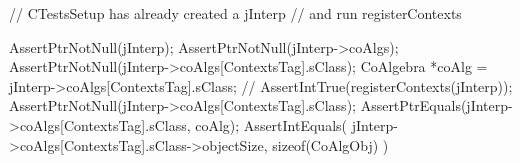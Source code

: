 
\startCTest
  // CTestsSetup has already created a jInterp
  // and run registerContexts
  
  AssertPtrNotNull(jInterp);
  AssertPtrNotNull(jInterp->coAlgs);
  AssertPtrNotNull(jInterp->coAlgs[ContextsTag].sClass);
  CoAlgebra *coAlg = jInterp->coAlgs[ContextsTag].sClass;
//  AssertIntTrue(registerContexts(jInterp));
  AssertPtrNotNull(jInterp->coAlgs[ContextsTag].sClass);
  AssertPtrEquals(jInterp->coAlgs[ContextsTag].sClass, coAlg);
  AssertIntEquals(
    jInterp->coAlgs[ContextsTag].sClass->objectSize,
    sizeof(CoAlgObj)
  )
\stopCTest

\stopTestCase
\stopTestSuite
